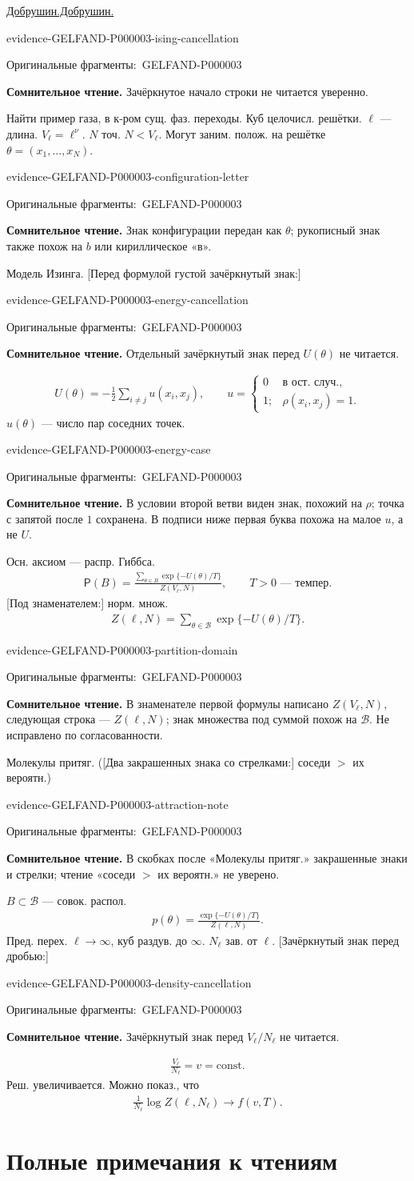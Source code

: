 \documentclass[11pt]{article}
\let\MathUnderline\underline
\renewcommand{\underline}[1]{\ifmmode\MathUnderline{#1}\else\uline{#1}\fi}
\newcommand{\EvidenceBlock}[4]{%
 \par\smallskip\noindent\begin{minipage}{\linewidth}
 \begin{minipage}[t]{.47\linewidth}\vspace{0pt}\centering
 \csname evidence-#1-#2\endcsname\par
 {\scriptsize\SourceCropCaption\ #1}\par
 \end{minipage}\hfill
 \begin{minipage}[t]{.49\linewidth}\vspace{0pt}\raggedright
 {\small\color{orange!65!black}\textbf{#4} #3}\par
 \end{minipage}
 \end{minipage}\par\smallskip}
\newcommand{\Unclear}[3]{\EvidenceBlock{#1}{#2}{#3}{\ReadingCaption}}
\newcommand{\SourceCropCaption}{Оригинальные фрагменты:}\newcommand{\ReadingCaption}{Сомнительное чтение.}\newcommand{\IncompleteCaption}{Неразобранный фрагмент.}\newcommand{\DiagramCaption}{Рисунок и набранное описание.}
\begin{document}
\underline{Добрушин.}
[Зачёркнуто перед «Найти»:] \Unclear{GELFAND-P000003}{ising-cancellation}{Зачёркнутое начало строки не читается уверенно.}
Найти пример газа, в к-ром сущ. фаз. переходы.
Куб целочисл. решётки.
$\ell$ — длина. $V_\ell=\ell^\nu$.
$N$ точ. $N<V_\ell$.
Могут заним. полож. на решётке
$\theta=(x_1,\ldots,x_N)$.
\Unclear{GELFAND-P000003}{configuration-letter}{Знак конфигурации передан как $\theta$; рукописный знак также похож на $b$ или кириллическое «в».}

Модель Изинга.
[Перед формулой густой зачёркнутый знак:]
\Unclear{GELFAND-P000003}{energy-cancellation}{Отдельный зачёркнутый знак перед $U(\theta)$ не читается.}
\begin{gather*}
 U(\theta)=-\frac12\sum_{i\ne j}u(x_i,x_j),\qquad
 u=\begin{cases}
 0&\text{в ост. случ.},\\
 1;&\rho(x_i,x_j)=1.
 \end{cases}
\end{gather*}
$u(\theta)$ — число пар соседних точек.
\Unclear{GELFAND-P000003}{energy-case}{В условии второй ветви виден знак, похожий на $\rho$; точка с запятой после $1$ сохранена. В подписи ниже первая буква похожа на малое $u$, а не $U$.}

Осн. аксиом — распр. Гиббса.
\begin{gather*}
 \mathsf{P}(B)=
 \frac{\displaystyle\sum_{\theta\in B}\exp\{-U(\theta)/T\}}
 {Z(V_\ell,N)},\qquad T>0\text{ — темпер.}
\end{gather*}
[Под знаменателем:] норм. множ.
\begin{gather*}
 Z(\ell,N)=\sum_{\theta\in\mathcal{B}}\exp\{-U(\theta)/T\}.
\end{gather*}
\Unclear{GELFAND-P000003}{partition-domain}{В знаменателе первой формулы написано $Z(V_\ell,N)$, следующая строка — $Z(\ell,N)$; знак множества под суммой похож на $\mathcal{B}$. Не исправлено по согласованности.}

Молекулы притяг.
([Два закрашенных знака со стрелками:] соседи $>$ их вероятн.)
\Unclear{GELFAND-P000003}{attraction-note}{В скобках после «Молекулы притяг.» закрашенные знаки и стрелки; чтение «соседи $>$ их вероятн.» не уверено.}
$B\subset\mathcal{B}$ — совок. распол.
\begin{gather*}
 p(\theta)=\frac{\exp\{-U(\theta)/T\}}{Z(\ell,N)}.
\end{gather*}
Пред. перех. $\ell\to\infty$, куб раздув. до $\infty$.
$N_\ell$ зав. от $\ell$.
[Зачёркнутый знак перед дробью:]
\Unclear{GELFAND-P000003}{density-cancellation}{Зачёркнутый знак перед $V_\ell/N_\ell$ не читается.}
\begin{gather*}
 \frac{V_\ell}{N_\ell}=v=\mathrm{const}.
\end{gather*}
Реш. увеличивается.
Можно показ., что
\begin{gather*}
 \frac1{N_\ell}\log Z(\ell,N_\ell)\longrightarrow f(v,T).
\end{gather*}
\clearpage\section*{Полные примечания к чтениям}
\end{document}
